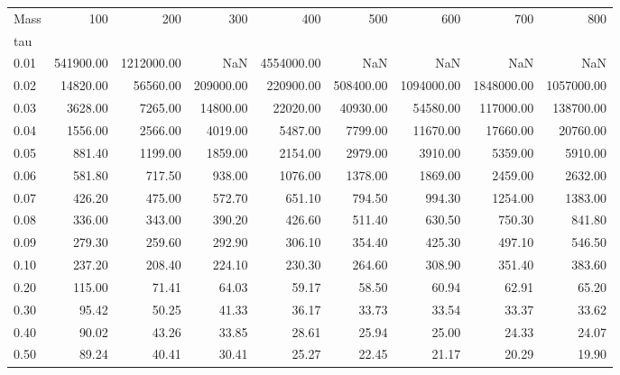 \begin{tabular}{lrrrrrrrr}
\toprule
Mass &        100 &         200 &        300 &         400 &        500 &         600 &         700 &         800 \\
tau   &            &             &            &             &            &             &             &             \\
\midrule
0.01  &  541900.00 &  1212000.00 &        NaN &  4554000.00 &        NaN &         NaN &         NaN &         NaN \\
0.02  &   14820.00 &    56560.00 &  209000.00 &   220900.00 &  508400.00 &  1094000.00 &  1848000.00 &  1057000.00 \\
0.03  &    3628.00 &     7265.00 &   14800.00 &    22020.00 &   40930.00 &    54580.00 &   117000.00 &   138700.00 \\
0.04  &    1556.00 &     2566.00 &    4019.00 &     5487.00 &    7799.00 &    11670.00 &    17660.00 &    20760.00 \\
0.05  &     881.40 &     1199.00 &    1859.00 &     2154.00 &    2979.00 &     3910.00 &     5359.00 &     5910.00 \\
0.06  &     581.80 &      717.50 &     938.00 &     1076.00 &    1378.00 &     1869.00 &     2459.00 &     2632.00 \\
0.07  &     426.20 &      475.00 &     572.70 &      651.10 &     794.50 &      994.30 &     1254.00 &     1383.00 \\
0.08  &     336.00 &      343.00 &     390.20 &      426.60 &     511.40 &      630.50 &      750.30 &      841.80 \\
0.09  &     279.30 &      259.60 &     292.90 &      306.10 &     354.40 &      425.30 &      497.10 &      546.50 \\
0.10  &     237.20 &      208.40 &     224.10 &      230.30 &     264.60 &      308.90 &      351.40 &      383.60 \\
0.20  &     115.00 &       71.41 &      64.03 &       59.17 &      58.50 &       60.94 &       62.91 &       65.20 \\
0.30  &      95.42 &       50.25 &      41.33 &       36.17 &      33.73 &       33.54 &       33.37 &       33.62 \\
0.40  &      90.02 &       43.26 &      33.85 &       28.61 &      25.94 &       25.00 &       24.33 &       24.07 \\
0.50  &      89.24 &       40.41 &      30.41 &       25.27 &      22.45 &       21.17 &       20.29 &       19.90 \\

\end{tabular}
